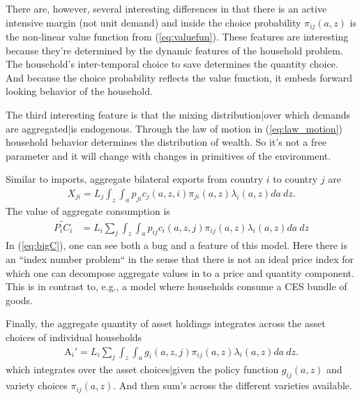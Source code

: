 \documentclass[12pt,pdftex]{article}
\begin{document}
\begin{onehalfspacing}
There are, however, several interesting differences in that there is an active intensive margin (not unit demand) and inside the choice probability $\pi_{ij}(a, z)$ is the non-linear value function from (\ref{eq:valuefun}). These features are interesting because they're determined by the dynamic features of the household problem. The household's inter-temporal choice to save determines the quantity choice. And because the choice probability reflects the value function, it embeds forward looking behavior of the household.

The third interesting feature is that the mixing distribution|over which demands are aggregated|is endogenous. Through the law of motion in (\ref{eq:law_motion}) household behavior determines the distribution of wealth. So it's not a free parameter and it will change with changes in primitives of the environment.

Similar to imports, aggregate bilateral exports from country $i$ to country $j$ are
\begin{align}
X_{ji} = L_j \int_{z} \int_{a}  p_{ji} c_{j}(a, z, i) \pi_{ji}(a, z) \lambda_i(a, z)da \ dz.
\label{eq:exports}
\end{align}
The value of aggregate consumption is
\begin{align}
\widetilde{P_{i} C_i}  &=  L_{i} \sum_{j} \int_{z} \int_{a}  p_{ij} c_{i}(a, z, j) \pi_{ij}(a, z) \lambda_i(a, z)da \ dz \label{eq:bigC}
\end{align}
In (\ref{eq:bigC}), one can see both a bug and a feature of this model. Here there is an ``index number problem`` in the sense that there is not an ideal price index for which one can decompose aggregate values in to a price and quantity component. This is in contrast to, e.g., a model where households consume a CES bundle of goods.

Finally, the aggregate quantity of asset holdings integrates across the asset choices of individual households
\begin{align}
\mathrm{A}_i' = L_{i}\sum_{j} \int_{z} \int_{a}  g_{i}(a, z, j) \pi_{ij}(a, z) \lambda_i(a, z) da \ dz.
\label{eq:aggregate_asset}
\end{align}
which integrates over the asset choices|given the policy function $g_{ij}(a, z)$ and variety choices $\pi_{ij}(a, z)$. And then sum's across the different varieties available.


\end{onehalfspacing}
\end{document}
